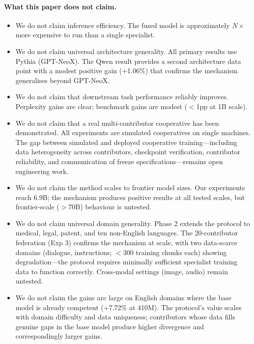 \documentclass{article}
\begin{document}
\paragraph{What this paper does not claim.}
\begin{itemize}[leftmargin=*, itemsep=1pt]
  \item We do not claim inference efficiency. The fused model is approximately $N\times$ more expensive to run than a single specialist.
  \item We do not claim universal architecture generality. All primary results use Pythia (GPT-NeoX). The Qwen result provides a second architecture data point with a modest positive gain (+1.06\%) that confirms the mechanism generalises beyond GPT-NeoX.
  \item We do not claim that downstream task performance reliably improves. Perplexity gains are clear; benchmark gains are modest ($<$1pp at 1B scale).
  \item We do not claim that a real multi-contributor cooperative has been demonstrated. All experiments are simulated cooperatives on single machines. The gap between simulated and deployed cooperative training---including data heterogeneity across contributors, checkpoint verification, contributor reliability, and communication of freeze specifications---remains open engineering work.
  \item We do not claim the method scales to frontier model sizes. Our experiments reach 6.9B; the mechanism produces positive results at all tested scales, but frontier-scale ($>$70B) behaviour is untested.
  \item We do not claim universal domain generality. Phase 2 extends the protocol to medical, legal, patent, and ten non-English languages. The 20-contributor federation (Exp 3) confirms the mechanism at scale, with two data-scarce domains (dialogue, instructions; ${<}$300 training chunks each) showing degradation---the protocol requires minimally sufficient specialist training data to function correctly. Cross-modal settings (image, audio) remain untested.
  \item We do not claim the gains are large on English domains where the base model is already competent (+7.72\% at 410M). The protocol's value scales with domain difficulty and data uniqueness; contributors whose data fills genuine gaps in the base model produce higher divergence and correspondingly larger gains.
\end{itemize}
\end{document}

